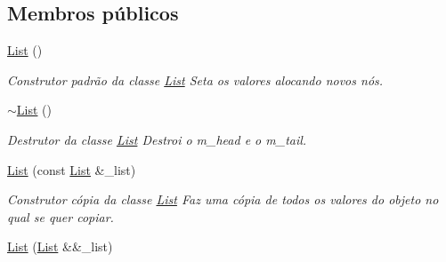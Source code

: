 \subsection*{Membros públicos}
\begin{DoxyCompactItemize}
\item 
\hyperlink{class_list_a5c5e27671b21b3815d4e25b953c69454}{List} ()\hypertarget{class_list_a5c5e27671b21b3815d4e25b953c69454}{}\label{class_list_a5c5e27671b21b3815d4e25b953c69454}

\begin{DoxyCompactList}\small\item\em Construtor padrão da classe \hyperlink{class_list}{List} Seta os valores alocando novos nós. \end{DoxyCompactList}\item 
\hyperlink{class_list_a2b58189090f6e5ce52939c9195e59e85}{$\sim$\+List} ()\hypertarget{class_list_a2b58189090f6e5ce52939c9195e59e85}{}\label{class_list_a2b58189090f6e5ce52939c9195e59e85}

\begin{DoxyCompactList}\small\item\em Destrutor da classe \hyperlink{class_list}{List} Destroi o m\+\_\+head e o m\+\_\+tail. \end{DoxyCompactList}\item 
\hyperlink{class_list_a1d0f3740befe48d6e9db8d6b1320491a}{List} (const \hyperlink{class_list}{List} \&\+\_\+list)\hypertarget{class_list_a1d0f3740befe48d6e9db8d6b1320491a}{}\label{class_list_a1d0f3740befe48d6e9db8d6b1320491a}

\begin{DoxyCompactList}\small\item\em Construtor cópia da classe \hyperlink{class_list}{List} Faz uma cópia de todos os valores do objeto no qual se quer copiar. \end{DoxyCompactList}\item 
\hyperlink{class_list_a196fe489dad007c9734efdf94060f21c}{List} (\hyperlink{class_list}{List} \&\&\+\_\+list)\hypertarget{class_list_a196fe489dad007c9734efdf94060f21c}{}\label{class_list_a196fe489dad007c9734efdf94060f21c}


\end{DoxyCompactItemize}
